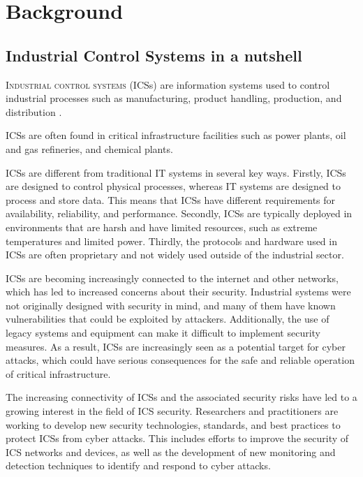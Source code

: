 \chapter{Background}
\label{background}

\section{Industrial Control Systems in a nutshell}
\label{sec:what_ics_are}

\linenumbers
\lettrine[lines=2]{I}{ndustrial control systems} (ICSs) are information systems used to control industrial processes such as manufacturing, product handling, production, and distribution \cite{ics_definition}.

ICSs are often found in critical infrastructure facilities such as power plants, oil and gas refineries, and chemical plants.

\bigskip
ICSs are different from traditional IT systems in several key ways. Firstly, ICSs are designed to control physical processes, whereas IT systems are designed to process and store data. This means that ICSs have different requirements for availability, reliability, and performance. Secondly, ICSs are typically deployed in environments that are harsh and have limited resources, such as extreme temperatures and limited power. Thirdly, the protocols and hardware used in ICSs are often proprietary and not widely used outside of the industrial sector.

\bigskip
ICSs are becoming increasingly connected to the internet and other networks, which has led to increased concerns about their security. Industrial systems were not originally designed with security in mind, and many of them have known vulnerabilities that could be exploited by attackers. Additionally, the use of legacy systems and equipment can make it difficult to implement security measures. As a result, ICSs are increasingly seen as a potential target for cyber attacks, which could have serious consequences for the safe and reliable operation of critical infrastructure.

\bigskip
The increasing connectivity of ICSs and the associated security risks have led to a growing interest in the field of ICS security. Researchers and practitioners are working to develop new security technologies, standards, and best practices to protect ICSs from cyber attacks. This includes efforts to improve the security of ICS networks and devices, as well as the development of new monitoring and detection techniques to identify and respond to cyber attacks.

